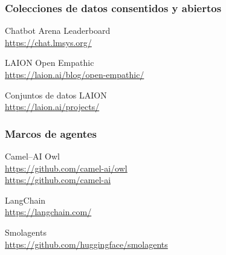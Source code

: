 \documentclass[17pt,aspectratio=169,hyperref={pdfusetitle,colorlinks,allcolors=olive}]{beamer}
\begin{document}
\begin{frame}[fragile]
\frametitle{Colecciones de datos consentidos y abiertos}

Chatbot Arena Leaderboard \\
\url{https://chat.lmsys.org/}

LAION Open Empathic \\
\url{https://laion.ai/blog/open-empathic/}

Conjuntos de datos LAION \\
\url{https://laion.ai/projects/}
\end{frame}

\begin{frame}[fragile]
\frametitle{Marcos de agentes}

Camel--AI Owl \\
{\small \url{https://github.com/camel-ai/owl} \\
\url{https://github.com/camel-ai}}

LangChain \\
{\small \url{https://langchain.com/}}

Smolagents \\
{\small \url{https://github.com/huggingface/smolagents}}
\end{frame}






\end{document}
